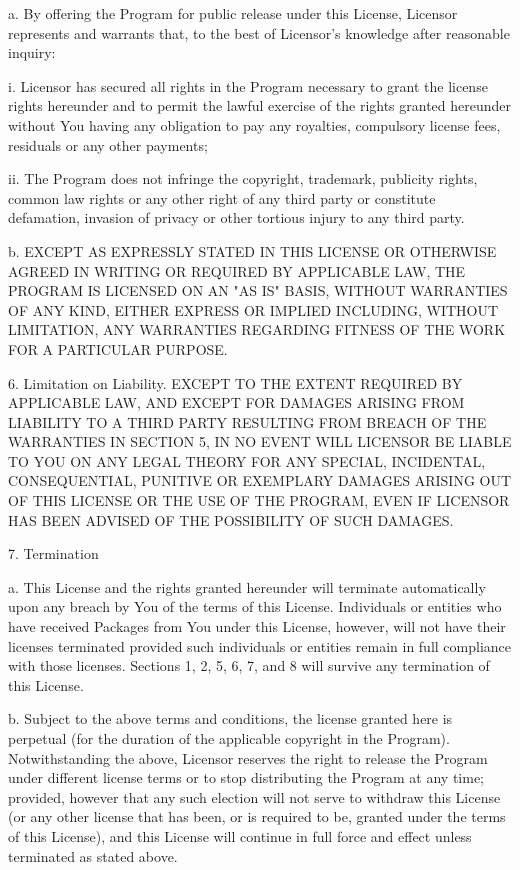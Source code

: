 a.    By offering the Program for public release under this License, Licensor
represents and warrants that, to the best of Licensor's knowledge after
reasonable inquiry:

i.      Licensor has secured all rights in the Program necessary to grant the
license rights hereunder and to permit the lawful exercise of the rights granted
hereunder without You having any obligation to pay any royalties, compulsory
license fees, residuals or any other payments;

ii.      The Program does not infringe the copyright, trademark, publicity
rights, common law rights or any other right of any third party or constitute
defamation, invasion of privacy or other tortious injury to any third party.

b.    EXCEPT AS EXPRESSLY STATED IN THIS LICENSE OR OTHERWISE AGREED IN WRITING
OR REQUIRED BY APPLICABLE LAW, THE PROGRAM IS LICENSED ON AN "AS IS" BASIS,
WITHOUT WARRANTIES OF ANY KIND, EITHER EXPRESS OR IMPLIED INCLUDING, WITHOUT
LIMITATION, ANY WARRANTIES REGARDING FITNESS OF THE WORK FOR A PARTICULAR
PURPOSE.

6. Limitation on Liability. EXCEPT TO THE EXTENT REQUIRED BY APPLICABLE LAW,
AND EXCEPT FOR DAMAGES ARISING FROM LIABILITY TO A THIRD PARTY RESULTING FROM
BREACH OF THE WARRANTIES IN SECTION 5, IN NO EVENT WILL LICENSOR BE LIABLE TO
YOU ON ANY LEGAL THEORY FOR ANY SPECIAL, INCIDENTAL, CONSEQUENTIAL, PUNITIVE OR
EXEMPLARY DAMAGES ARISING OUT OF THIS LICENSE OR THE USE OF THE PROGRAM, EVEN IF
LICENSOR HAS BEEN ADVISED OF THE POSSIBILITY OF SUCH DAMAGES.

7. Termination

a.    This License and the rights granted hereunder will terminate automatically
upon any breach by You of the terms of this License. Individuals or entities who
have received Packages from You under this License, however, will not have their
licenses terminated provided such individuals or entities remain in full
compliance with those licenses. Sections 1, 2, 5, 6, 7, and 8 will survive any
termination of this License.

b.    Subject to the above terms and conditions, the license granted here is
perpetual (for the duration of the applicable copyright in the Program).
Notwithstanding the above, Licensor reserves the right to release the Program
under different license terms or to stop distributing the Program at any time;
provided, however that any such election will not serve to withdraw this License
(or any other license that has been, or is required to be, granted under the
terms of this License), and this License will continue in full force and effect
unless terminated as stated above.

